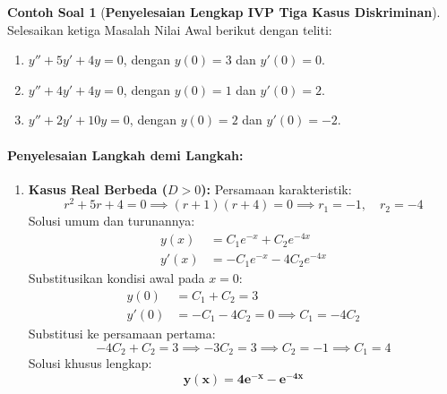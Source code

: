 \documentclass[11pt,a4paper]{article}
\theoremstyle{definition}
\newtheorem{example}{Contoh Soal}[section]
\begin{document}
\begin{example}[\textbf{Penyelesaian Lengkap IVP Tiga Kasus Diskriminan}]
Selesaikan ketiga Masalah Nilai Awal berikut dengan teliti:
\begin{enumerate}[label=(\alph*)]
    \item $y'' + 5y' + 4y = 0$, dengan $y(0) = 3$ dan $y'(0) = 0$.
    \item $y'' + 4y' + 4y = 0$, dengan $y(0) = 1$ dan $y'(0) = 2$.
    \item $y'' + 2y' + 10y = 0$, dengan $y(0) = 2$ dan $y'(0) = -2$.
\end{enumerate}

\paragraph{Penyelesaian Langkah demi Langkah:}
\begin{enumerate}[label=(\alph*), leftmargin=*]
    \item \textbf{Kasus Real Berbeda ($D > 0$):}
    Persamaan karakteristik:
    \begin{equation*}
        r^2 + 5r + 4 = 0 \implies (r + 1)(r + 4) = 0 \implies r_1 = -1, \quad r_2 = -4
    \end{equation*}
    Solusi umum dan turunannya:
    \begin{align*}
        y(x) &= C_1 e^{-x} + C_2 e^{-4x} \\
        y'(x) &= -C_1 e^{-x} - 4C_2 e^{-4x}
    \end{align*}
    Substitusikan kondisi awal pada $x = 0$:
    \begin{align*}
        y(0) &= C_1 + C_2 = 3 \\
        y'(0) &= -C_1 - 4C_2 = 0 \implies C_1 = -4C_2
    \end{align*}
    Substitusi ke persamaan pertama:
    \begin{equation*}
        -4C_2 + C_2 = 3 \implies -3C_2 = 3 \implies C_2 = -1 \implies C_1 = 4
    \end{equation*}
    Solusi khusus lengkap:
    \begin{equation*}
        \mathbf{y(x) = 4e^{-x} - e^{-4x}}
    \end{equation*}


\end{enumerate}
\end{example}
\end{document}
